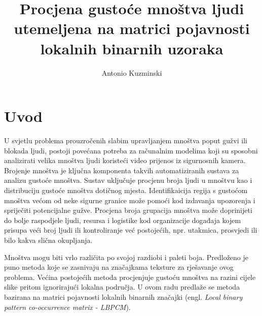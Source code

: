\documentclass[times, utf8, zavrsni]{fer}
\begin{document}

\title{Procjena gustoće mnoštva ljudi utemeljena na matrici pojavnosti lokalnih binarnih uzoraka}

\author{Antonio Kuzminski}

\maketitle

\izvornik

\zahvala{}

\tableofcontents

\chapter{Uvod}

U svjetlu problema prouzročenih slabim upravljanjem mnoštva poput
gužvi ili blokada ljudi, postoji povećana potreba za računalnim modelima
koji su sposobni analizirati velika mnoštva ljudi koristeći video prijenos
iz sigurnosnih kamera. Brojenje mnoštva je ključna komponenta takvih 
automatiziranih sustava za analizu gustoće mnoštva. Sustav uključuje 
procjenu broja ljudi u mnoštvu kao i distribuciju gustoće mnoštva
dotičnog mjesta. Identifikaicija regija s gustoćom mnoštva većom
od neke sigurne granice može pomoći kod izdavanja upozorenja i spriječiti
potencijalne gužve. Procjena broja grupacija mnoštva može doprinijeti
do bolje raspodjele ljudi, resursa i logistike kod organizacije događaja
kojem prisupa veći broj ljudi ili kontroliranje već postojećih, npr. 
utakmica, prosvjedi ili bilo kakva slična okupljanja.

\bigbreak

Mnoštva mogu biti vrlo različita po svojoj razdiobi i paleti boja. Predloženo 
je puno metoda koje se zasnivaju na značajkama teksture za rješavanje ovog
problema. Većina postojećih metoda procjenjuje gustoću mnoštva na razini
cijele slike pritom ignorirajući lokalna područja. U ovom radu predlaže se
metoda bazirana na matrici pojavnosti lokalnih binarnih značajki
(engl. \textit{Local binary pattern co-occurrence matrix - LBPCM}).

\bigbreak
\end{document}
